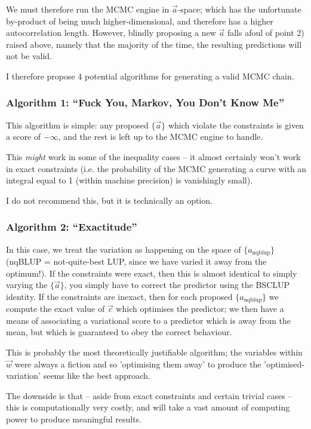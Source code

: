 \documentclass[]{article}
\begin{document}
			We must therefore run the MCMC engine in $\vec{a}$-space; which has the unfortunate by-product of being much higher-dimensional, and therefore has a higher autocorrelation length. However, blindly proposing a new $\vec{a}$ falls afoul of point 2) raised above, namely that the majority of the time, the resulting predictions will not be valid. 


			I therefore propose 4 potential algorithms for generating a valid MCMC chain.

			\subsubsection*{Algorithm 1: ``Fuck You, Markov, You Don't Know Me''}
				
				This algorithm is simple: any proposed $\{\vec{a}\}$ which violate the constraints is given a score of $-\infty$, and the rest is left up to the MCMC engine to handle. 

				This \textit{might} work in some of the inequality cases -- it almost certainly won't work in exact constraints (i.e. the probability of the MCMC generating a curve with an integral equal to 1 (within machine precision) is vanishingly small).

				I do not recommend this, but it is technically an option.

			\subsubsection*{Algorithm 2: ``Exactitude''}

				In this case, we treat the variation as happening on the space of $\{a_\text{nqblup} \}$ (nqBLUP = not-quite-best LUP, since we have varied it away from the optimum!). If the constraints were exact, then this is almost identical to simply varying the $\{\vec{a}\}$, you simply have to correct the predictor using the BSCLUP identity. If the constraints are inexact, then for each proposed $\{ a_\text{nqblup}\}$ we compute the exact value of $\vec{c}$ which optimises the predictor; we then have a means of associating a variational score to a predictor which is away from the mean, but which is guaranteed to obey the correct behaviour. 

				This is probably the most theoretically justifiable algorithm; the variables within $\vec{w}$ were always a fiction and so 'optimising them away' to produce the 'optimised-variation' seems like the best approach. 

				The downside is that -- aside from exact constraints and certain trivial cases -- this is computationally very costly, and will take a vast amount of computing power to produce meaningful results.
				
\end{document}
